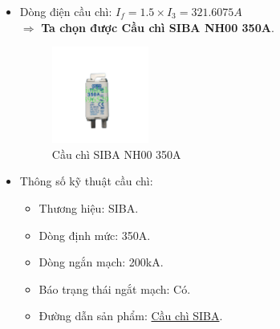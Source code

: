                \begin{itemize}
                    \item Dòng điện cầu chì: $I_{f} = 1.5 \times I_{3} = 321.6075A$ \\[0.2cm]
                        $\Rightarrow$ \textbf{Ta chọn được Cầu chì SIBA NH00 350A}.
                        \begin{figure}[H]
                            \centering
                            \includegraphics[width=0.3\textwidth]{pictures/2g.png}
                            \caption{Cầu chì SIBA NH00 350A}
                        \end{figure}
                    \item Thông số kỹ thuật cầu chì:
                        \begin{itemize}
                            \item Thương hiệu: SIBA.
                            \item Dòng định mức: 350A.
                            \item Dòng ngắn mạch: 200kA.
                            \item Báo trạng thái ngắt mạch: Có.
                            \item Đường dẫn sản phẩm: \href{https://thietbidienloiloidat.com/san-pham/cau-chi-siba-nh00-350a/}{Cầu chì SIBA}.
                        \end{itemize}
                \end{itemize}
